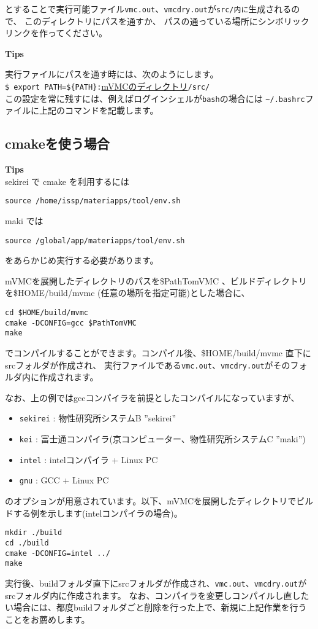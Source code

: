 とすることで実行可能ファイル\verb|vmc.out|、\verb|vmcdry.out|が\verb|src/内に|生成されるので、
このディレクトリにパスを通すか、
パスの通っている場所にシンボリックリンクを作ってください。

\begin{screen}
\Large 
{\bf Tips}
\normalsize

実行ファイルにパスを通す時には、次のようにします。
\\
\verb|$ export PATH=${PATH}:|\underline{mVMCのディレクトリ}\verb|/src/|
\\
この設定を常に残すには、例えばログインシェルが\verb|bash|の場合には
\verb|~/.bashrc|ファイルに上記のコマンドを記載します。
\end{screen}

\subsection{cmakeを使う場合}

\begin{screen}
\Large 
{\bf Tips}
\normalsize\\
sekirei で cmake を利用するには
\begin{verbatim}
source /home/issp/materiapps/tool/env.sh
\end{verbatim}
maki では
\begin{verbatim}
source /global/app/materiapps/tool/env.sh
\end{verbatim}
をあらかじめ実行する必要があります。
\end{screen}

mVMCを展開したディレクトリのパスを\$PathTomVMC 、ビルドディレクトリを\$HOME/build/mvmc (任意の場所を指定可能)とした場合に、
\begin{verbatim}
cd $HOME/build/mvmc
cmake -DCONFIG=gcc $PathTomVMC
make
\end{verbatim}
でコンパイルすることができます。コンパイル後、\$HOME/build/mvmc 直下にsrcフォルダが作成され、
実行ファイルである\verb|vmc.out|、\verb|vmcdry.out|がそのフォルダ内に作成されます。

なお、上の例ではgccコンパイラを前提としたコンパイルになっていますが、
\begin{itemize}
\item \verb|sekirei| : 物性研究所システムB ''sekirei''
\item \verb|kei| : 富士通コンパイラ(京コンピューター、物性研究所システムC ''maki'')
\item \verb|intel| : intelコンパイラ + Linux PC
\item \verb|gnu| : GCC + Linux PC
\end{itemize}
のオプションが用意されています。以下、mVMCを展開したディレクトリでビルドする例を示します(intelコンパイラの場合)。
\begin{verbatim}
mkdir ./build
cd ./build
cmake -DCONFIG=intel ../
make
\end{verbatim}
実行後、buildフォルダ直下にsrcフォルダが作成され、\verb|vmc.out|、\verb|vmcdry.out|がsrcフォルダ内に作成されます。
なお、コンパイラを変更しコンパイルし直したい場合には、都度buildフォルダごと削除を行った上で、新規に上記作業を行うことをお薦めします。

